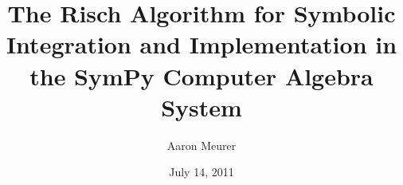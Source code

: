 \documentclass{beamer}
\title{The Risch Algorithm for Symbolic
Integration and Implementation in the SymPy Computer Algebra System}
\author{Aaron Meurer}
\date{July 14, 2011}
\numberwithin{equation}{section} %
\begin{document}
\begin{frame}
    \titlepage
\end{frame}

\end{document}
